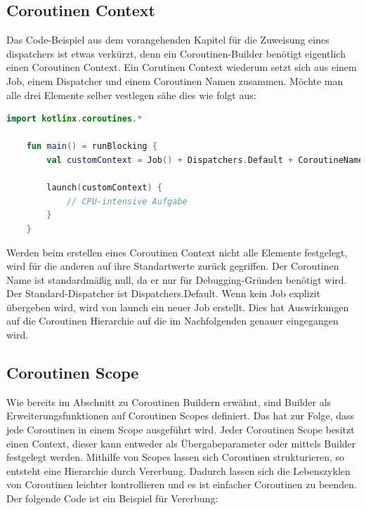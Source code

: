 \documentclass[fontsize=12pt,paper=a4,twoside=semi,parskip=half-,headsepline,headinclude]{scrreprt}
\begin{document}
\subsection{Coroutinen Context}

Das Code-Beispiel aus dem vorangehenden Kapitel für die Zuweisung eines dispatchers ist etwas verkürzt, denn ein Coroutinen-Builder benötigt eigentlich einen Coroutinen Context. Ein Corutinen Context wiederum setzt sich aus einem Job, einem Dispatcher und einem Coroutinen Namen zusammen. Möchte man alle drei Elemente selber vestlegen sähe dies wie folgt aus:

\begin{lstlisting}[language=Kotlin]
	import kotlinx.coroutines.*

	fun main() = runBlocking {
		val customContext = Job() + Dispatchers.Default + CoroutineName("MyCoroutine")
	
		launch(customContext) {
			// CPU-intensive Aufgabe
		}
	}
\end{lstlisting}

Werden beim erstellen eines Coroutinen Context nicht alle Elemente festgelegt, wird für die anderen auf ihre Standartwerte zurück gegriffen. Der Coroutinen Name ist standardmäßig null, da er nur für Debugging-Gründen benötigt wird. Der Standard-Dispatcher ist Dispatchers.Default. Wenn kein Job explizit übergeben wird, wird von launch ein neuer Job erstellt. Dies hat Auswirkungen auf die Coroutinen Hierarchie auf die im Nachfolgenden genauer eingegangen wird.

\subsection{Coroutinen Scope}

Wie bereits im Abschnitt zu Coroutinen Buildern erwähnt, sind Builder als Erweiterungsfunktionen auf Coroutinen Scopes definiert. Das hat zur Folge, dass jede Coroutinen in einem Scope ausgeführt wird. Jeder Coroutinen Scope besitzt einen Context, dieser kann entweder als Übergabeparameter oder mittels Builder festgelegt werden. Mithilfe von Scopes lassen sich Coroutinen strukturieren, so entsteht eine Hierarchie durch Vererbung. Dadurch lassen sich die Lebenszyklen von Coroutinen leichter kontrollieren und es ist einfacher Coroutinen zu beenden. Der folgende Code ist ein Beispiel für Vererbung:
\end{document}
